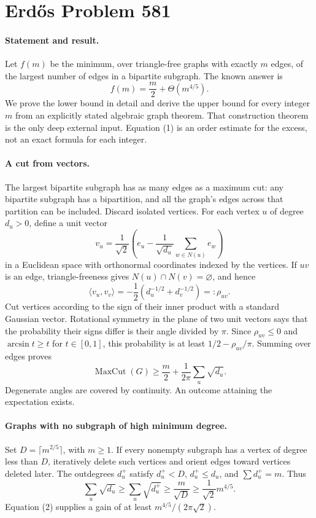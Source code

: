 \section*{Erd\H{o}s Problem 581}

\paragraph{Statement and result.}
Let \(f(m)\) be the minimum, over triangle-free graphs with exactly \(m\) edges, of the largest number of edges in a bipartite subgraph. The known answer is
\[
 f(m)=\frac m2+\Theta(m^{4/5}). \tag{1}
\]
We prove the lower bound in detail and derive the upper bound for every integer \(m\) from an explicitly stated algebraic graph theorem. That construction theorem is the only deep external input. Equation (1) is an order estimate for the excess, not an exact formula for each integer.

\paragraph{A cut from vectors.}
The largest bipartite subgraph has as many edges as a maximum cut: any bipartite subgraph has a bipartition, and all the graph's edges across that partition can be included. Discard isolated vertices. For each vertex \(u\) of degree \(d_u>0\), define a unit vector
\[
 v_u=\frac1{\sqrt2}\left(e_u-\frac1{\sqrt{d_u}}\sum_{w\in N(u)}e_w\right)
\]
in a Euclidean space with orthonormal coordinates indexed by the vertices. If \(uv\) is an edge, triangle-freeness gives \(N(u)\cap N(v)=\varnothing\), and hence
\[
 \langle v_u,v_v\rangle=-\frac12\left(d_u^{-1/2}+d_v^{-1/2}\right)=:\rho_{uv}.
\]
Cut vertices according to the sign of their inner product with a standard Gaussian vector. Rotational symmetry in the plane of two unit vectors says that the probability their signs differ is their angle divided by \(\pi\). Since \(\rho_{uv}\leq0\) and \(\arcsin t\geq t\) for \(t\in[0,1]\), this probability is at least \(1/2-\rho_{uv}/\pi\). Summing over edges proves
\[
 \operatorname{MaxCut}(G)\geq\frac m2+
 \frac1{2\pi}\sum_u\sqrt{d_u}. \tag{2}
\]
Degenerate angles are covered by continuity. An outcome attaining the expectation exists.

\paragraph{Graphs with no subgraph of high minimum degree.}
Set \(D=\lceil m^{2/5}\rceil\), with \(m\geq1\). If every nonempty subgraph has a vertex of degree less than \(D\), iteratively delete such vertices and orient edges toward vertices deleted later. The outdegrees \(d_u^+\) satisfy \(d_u^+<D\), \(d_u^+\leq d_u\), and \(\sum d_u^+=m\). Thus
\[
 \sum_u\sqrt{d_u}\geq\sum_u\sqrt{d_u^+}
 \geq\frac m{\sqrt D}\geq\frac1{\sqrt2}m^{4/5}.
\]
Equation (2) supplies a gain of at least \(m^{4/5}/(2\pi\sqrt2)\).

